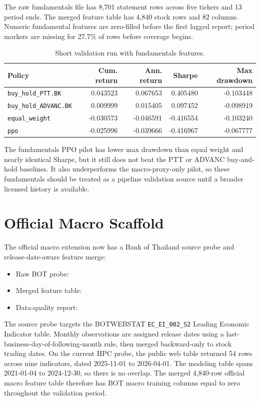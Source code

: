 \documentclass[11pt]{article}
\begin{document}
The raw fundamentals file has 8,701 statement rows across five tickers and 13 period ends. The merged feature table has 4,840 stock rows and 82 columns. Numeric fundamental features are zero-filled before the first lagged report; period markers are missing for 27.7\% of rows before coverage begins.

\begin{table}[h]
\centering
\caption{Short validation run with fundamentals features.}
\label{tab:fundamentals-context}
\begin{tabular}{lrrrr}
\toprule
Policy & Cum. return & Ann. return & Sharpe & Max drawdown \\
\midrule
\texttt{buy\_hold\_PTT.BK} & 0.043523 & 0.067653 & 0.405480 & -0.103448 \\
\texttt{buy\_hold\_ADVANC.BK} & 0.009999 & 0.015405 & 0.097452 & -0.098919 \\
\texttt{equal\_weight} & -0.030573 & -0.046591 & -0.416554 & -0.103240 \\
\texttt{ppo} & -0.025996 & -0.039666 & -0.416967 & -0.067777 \\
\bottomrule
\end{tabular}
\end{table}

The fundamentals PPO pilot has lower max drawdown than equal weight and nearly identical Sharpe, but it still does not beat the PTT or ADVANC buy-and-hold baselines. It also underperforms the macro-proxy-only pilot, so these fundamentals should be treated as a pipeline validation source until a broader licensed history is available.

\section{Official Macro Scaffold}
The official macro extension now has a Bank of Thailand source probe and release-date-aware feature merge:
\begin{itemize}
\item Raw BOT probe: 
\item Merged feature table: 
\item Data-quality report: 
\end{itemize}

The source probe targets the BOTWEBSTAT \texttt{EC\_EI\_002\_S2} Leading Economic Indicator table. Monthly observations are assigned release dates using a last-business-day-of-following-month rule, then merged backward-only to stock trading dates. On the current HPC probe, the public web table returned 54 rows across nine indicators, dated 2025-11-01 to 2026-04-01. The modeling table spans 2021-01-04 to 2024-12-30, so there is no overlap. The merged 4,840-row official macro feature table therefore has BOT macro training columns equal to zero throughout the validation period.
\end{document}
